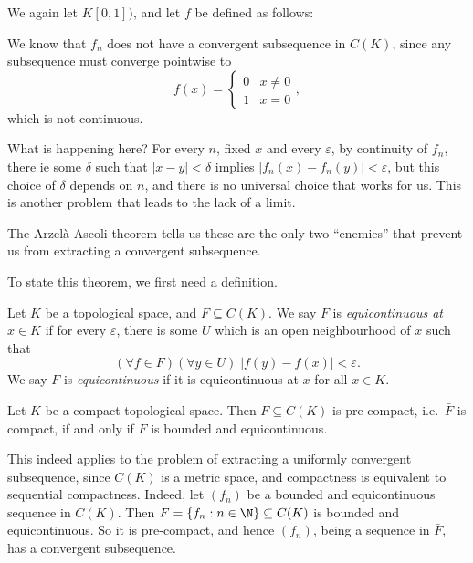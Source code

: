 \documentclass[a4paper]{article}
\begin{document}
\begin{eg}
  We again let $K[0, 1])$, and let $f$ be defined as follows:
  \begin{center}
  \end{center}
  We know that $f_n$ does not have a convergent subsequence in $C(K)$, since any subsequence must converge pointwise to
  \[
    f(x) =
    \begin{cases}
      0 & x \not= 0\\
      1 & x = 0
    \end{cases},
  \]
  which is not continuous.
\end{eg}
What is happening here? For every $n$, fixed $x$ and every $\varepsilon$, by continuity of $f_n$, there ie some $\delta$ such that $|x - y| < \delta$ implies $|f_n(x) - f_n(y)| < \varepsilon$, but this choice of $\delta$ depends on $n$, and there is no universal choice that works for us. This is another problem that leads to the lack of a limit.

The Arzel\`a-Ascoli theorem tells us these are the only two ``enemies'' that prevent us from extracting a convergent subsequence.

To state this theorem, we first need a definition.
\begin{defi}[Equicontinuous]
  Let $K$ be a topological space, and $F\subseteq C(K)$. We say $F$ is \emph{equicontinuous at $x \in K$} if for every $\varepsilon$, there is some $U$ which is an open neighbourhood of $x$ such that
  \[
    (\forall f \in F)(\forall y \in U)\; |f(y) - f(x)| < \varepsilon.
  \]
  We say $F$ is \emph{equicontinuous} if it is equicontinuous at $x$ for all $x \in K$.
\end{defi}

\begin{thm}
  Let $K$ be a compact topological space. Then $F\subseteq C(K)$ is pre-compact, i.e.\ $\bar{F}$ is compact, if and only if $F$ is bounded and equicontinuous.
\end{thm}
This indeed applies to the problem of extracting a uniformly convergent subsequence, since $C(K)$ is a metric space, and compactness is equivalent to sequential compactness. Indeed, let $(f_n)$ be a bounded and equicontinuous sequence in $C(K)$. Then $F = \{f_n: n \in \N\} \subseteq C(K)$ is bounded and equicontinuous. So it is pre-compact, and hence $(f_n)$, being a sequence in $\bar{F}$, has a convergent subsequence.
\end{document}
